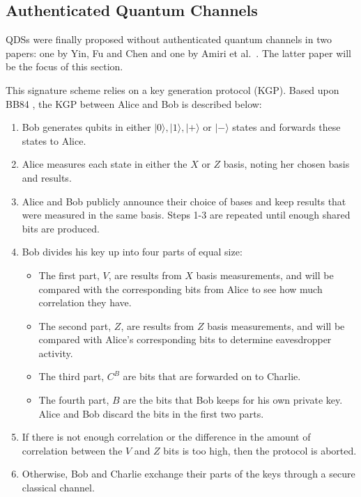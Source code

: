 \documentclass[%
 reprint,
 amsmath,amssymb,
 aps,
 pra,
]{revtex4-1}
\begin{document}
\subsection{Authenticated Quantum Channels}
\label{ssec:insecure-qc}

QDSs were finally proposed without authenticated quantum channels in two papers: one by Yin, Fu and Chen \cite{PhysRevA.93.032316} and one by Amiri et al.\ \cite{PhysRevA.93.032325}. The latter paper will be the focus of this section.

This signature scheme relies on a key generation protocol (KGP). Based upon BB84 \cite{BB84}, the KGP between Alice and Bob is described below:

\begin{enumerate}
\item Bob generates qubits in either $|0\rangle, |1\rangle, |+\rangle \text{ or } |-\rangle$ states and forwards these states to Alice.
\item Alice measures each state in either the $X$ or $Z$ basis, noting her chosen basis and results.
\item Alice and Bob publicly announce their choice of bases and keep results that were measured in the same basis. Steps 1-3 are repeated until enough shared bits are produced.
\item Bob divides his key up into four parts of equal size:
\begin{itemize}
\item The first part, $V$, are results from $X$ basis measurements, and will be compared with the corresponding bits from Alice to see how much correlation they have.
\item The second part, $Z$, are results from $Z$ basis measurements, and will be compared with Alice's corresponding bits to determine eavesdropper activity.
\item The third part, $C^B$ are bits that are forwarded on to Charlie.
\item The fourth part, $B$ are the bits that Bob keeps for his own private key. Alice and Bob discard the bits in the first two parts.
\end{itemize}
\item If there is not enough correlation or the difference in the amount of correlation between the $V$ and $Z$ bits is too high, then the protocol is aborted.
\item Otherwise, Bob and Charlie exchange their parts of the keys through a secure classical channel.
\end{enumerate}
\end{document}
